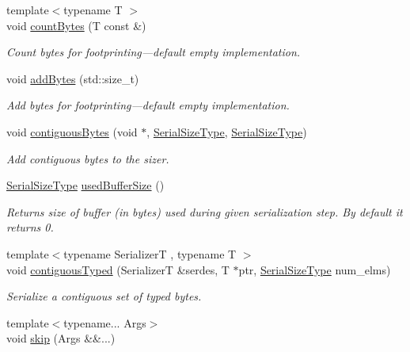 \begin{DoxyCompactItemize}
{\footnotesize template$<$typename T $>$ }\\void \hyperlink{structcheckpoint_1_1_base_serializer_a70ac6f61c442ade1a0179e353f866333}{count\+Bytes} (T const \&)
\begin{DoxyCompactList}\small\item\em Count bytes for footprinting---default empty implementation. \end{DoxyCompactList}\item 
void \hyperlink{structcheckpoint_1_1_base_serializer_a9c9d32a50074084f78f7c5e049227f25}{add\+Bytes} (std\+::size\+\_\+t)
\begin{DoxyCompactList}\small\item\em Add bytes for footprinting---default empty implementation. \end{DoxyCompactList}\item 
void \hyperlink{structcheckpoint_1_1_base_serializer_a4d3efc116b1962fe88c14aadcdf4df9e}{contiguous\+Bytes} (void $\ast$, \hyperlink{namespacecheckpoint_a083f6674da3f94c2901b18c6d238217c}{Serial\+Size\+Type}, \hyperlink{namespacecheckpoint_a083f6674da3f94c2901b18c6d238217c}{Serial\+Size\+Type})
\begin{DoxyCompactList}\small\item\em Add contiguous bytes to the sizer. \end{DoxyCompactList}\item 
\hyperlink{namespacecheckpoint_a083f6674da3f94c2901b18c6d238217c}{Serial\+Size\+Type} \hyperlink{structcheckpoint_1_1_base_serializer_a6ccb8bb1430ac5665aac995b6330bc8a}{used\+Buffer\+Size} ()
\begin{DoxyCompactList}\small\item\em Returns size of buffer (in bytes) used during given serialization step. By default it returns 0. \end{DoxyCompactList}\item 
{\footnotesize template$<$typename SerializerT , typename T $>$ }\\void \hyperlink{structcheckpoint_1_1_base_serializer_a7a18f4ba50fcfd8b37c8a6efc459ccde}{contiguous\+Typed} (SerializerT \&serdes, T $\ast$ptr, \hyperlink{namespacecheckpoint_a083f6674da3f94c2901b18c6d238217c}{Serial\+Size\+Type} num\+\_\+elms)
\begin{DoxyCompactList}\small\item\em Serialize a contiguous set of typed bytes. \end{DoxyCompactList}\item 
{\footnotesize template$<$typename... Args$>$ }\\void \hyperlink{structcheckpoint_1_1_base_serializer_a7e3575fbbd4bf5bc39d8efb67c014e07}{skip} (Args \&\&...)

\end{DoxyCompactItemize}
